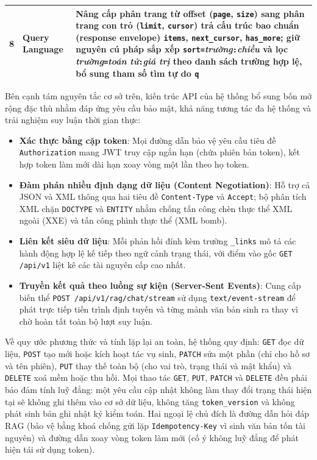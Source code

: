 \begin{table}[htbp]
\begin{tabularx}{\textwidth}{@{}l>{\raggedright\arraybackslash}p{3.7cm}>{\raggedright\arraybackslash}X@{}}
        8 & Query Language & Nâng cấp phân trang từ offset (\texttt{page}, \texttt{size}) sang phân trang con trỏ (\texttt{limit}, \texttt{cursor}) trả cấu trúc bao chuẩn (response envelope) \texttt{items}, \texttt{next\_cursor}, \texttt{has\_more}; giữ nguyên cú pháp sắp xếp \texttt{sort=}\textit{trường}\texttt{:}\textit{chiều} và lọc \textit{trường}\texttt{=}\textit{toán tử}\texttt{:}\textit{giá trị} theo danh sách trường hợp lệ, bổ sung tham số tìm tự do \texttt{q} \\
        \bottomrule
    \end{tabularx}
\end{table}

Bên cạnh tám nguyên tắc cơ sở trên, kiến trúc API của hệ thống bổ sung bốn mở rộng đặc thù nhằm đáp ứng yêu cầu bảo mật, khả năng tương tác đa hệ thống và trải nghiệm suy luận thời gian thực:

\begin{itemize}
    \item[--] \textbf{Xác thực bằng cặp token}: Mọi đường dẫn bảo vệ yêu cầu tiêu đề \texttt{Authorization} mang JWT truy cập ngắn hạn (chứa phiên bản token), kết hợp token làm mới dài hạn xoay vòng một lần theo họ token.
    \item[--] \textbf{Đàm phán nhiều định dạng dữ liệu (Content Negotiation)}: Hỗ trợ cả JSON và XML thông qua hai tiêu đề \texttt{Content-Type} và \texttt{Accept}; bộ phân tích XML chặn \texttt{DOCTYPE} và \texttt{ENTITY} nhằm chống tấn công chèn thực thể XML ngoài (XXE) và tấn công phình thực thể (XML bomb).
    \item[--] \textbf{Liên kết siêu dữ liệu}: Mỗi phản hồi đính kèm trường \texttt{\_links} mô tả các hành động hợp lệ kế tiếp theo ngữ cảnh trạng thái, với điểm vào gốc \texttt{GET /api/v1} liệt kê các tài nguyên cấp cao nhất.
    \item[--] \textbf{Truyền kết quả theo luồng sự kiện (Server-Sent Events)}: Cung cấp biến thể \texttt{POST /api/v1/rag/chat/stream} sử dụng \texttt{text/event-stream} để phát trực tiếp tiến trình định tuyến và từng mảnh văn bản sinh ra thay vì chờ hoàn tất toàn bộ lượt suy luận.
\end{itemize}

Về quy ước phương thức và tính lặp lại an toàn, hệ thống quy định: \texttt{GET} đọc dữ liệu, \texttt{POST} tạo mới hoặc kích hoạt tác vụ sinh, \texttt{PATCH} sửa một phần (chỉ cho hồ sơ và tên phiên), \texttt{PUT} thay thế toàn bộ (cho vai trò, trạng thái và mật khẩu) và \texttt{DELETE} xoá mềm hoặc thu hồi. Mọi thao tác \texttt{GET}, \texttt{PUT}, \texttt{PATCH} và \texttt{DELETE} đều phải bảo đảm tính luỹ đẳng: một yêu cầu cập nhật không làm thay đổi trạng thái hiện tại sẽ không ghi thêm vào cơ sở dữ liệu, không tăng \texttt{token\_version} và không phát sinh bản ghi nhật ký kiểm toán. Hai ngoại lệ chủ đích là đường dẫn hỏi đáp RAG (bảo vệ bằng khoá chống gửi lặp \texttt{Idempotency-Key} vì sinh văn bản tốn tài nguyên) và đường dẫn xoay vòng token làm mới (cố ý không luỹ đẳng để phát hiện tái sử dụng token).

